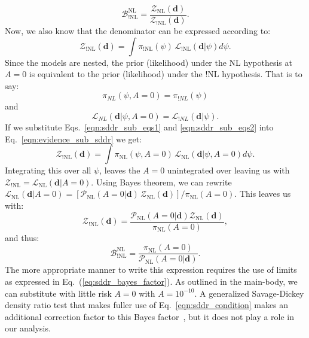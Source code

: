 \begin{equation}
    \mathcal{B}^{\mathrm{NL}}_{!\mathrm{NL}} = \frac{\mathcal{Z}_{\mathrm{NL}}(\mathbf{d})}{\mathcal{Z}_{\mathrm{!NL}}(\mathbf{d})}.
\end{equation}
Now, we also know that the denominator can be expressed according to:
\begin{equation}\label{eqn:evidence_sub_sddr}
    \mathcal{Z}_{\mathrm{!NL}}(\mathbf{d}) = \int \pi_{\mathrm{!NL}}\left(\psi\right) \, \mathcal{L}_{\mathrm{!NL}} \left(\mathbf{d} | \psi \right)  d\psi.
\end{equation}
Since the models are nested, the prior (likelihood) under the NL hypothesis at $A=0$ is equivalent to the prior (likelihood) under the !NL hypothesis. That is to say:
\begin{equation}\label{eqn:sddr_sub_eqs1}
\pi_{NL}\left(\psi, A=0\right) = \pi_{!NL}\left(\psi \right) \end{equation}
and
\begin{equation}
\label{eqn:sddr_sub_eqs2}
\mathcal{L}_{NL}\left(\mathbf{d}|\psi, A=0\right) = \mathcal{L}_{!NL}\left( \mathbf{d} | \psi \right).
\end{equation}
If we substitute Eqs.~\ref{eqn:sddr_sub_eqs1} and \ref{eqn:sddr_sub_eqs2} into Eq.~\ref{eqn:evidence_sub_sddr} we get:
\begin{equation}
    \mathcal{Z}_{\mathrm{!NL}}(\mathbf{d}) = \int \pi_{\mathrm{NL}}\left(\psi, A=0\right) \, \mathcal{L}_{\mathrm{NL}} \left(\mathbf{d} | \psi, A=0 \right)  d\psi.
\end{equation}
Integrating this over all $\psi$, leaves the $A=0$ unintegrated over leaving us with $\mathcal{Z}_{\mathrm{!NL}} = \mathcal{L}_{\mathrm{NL}} \left(\mathbf{d} | A=0 \right)$. Using Bayes theorem, we can rewrite $\mathcal{L}_{\mathrm{NL}} \left(\mathbf{d} | A=0 \right) = [\mathcal{P}_{\mathrm{NL}}(A=0 | \mathbf{d}) \, \mathcal{Z}_{\mathrm{NL}}(\mathbf{d})] / \pi_{\mathrm{NL}} (A=0)$. This leaves us with:
\begin{equation}
    \mathcal{Z}_{\mathrm{!NL}}\left(\mathbf{d}\right) = \frac{\mathcal{P}_{\mathrm{NL}}\left(A=0 | \mathbf{d}\right) \mathcal{Z}_{\mathrm{NL}} \left(\mathbf{d} \right)} {\pi_{\mathrm{NL}} \left(A=0\right)},
\end{equation}
and thus:
\begin{equation}
    \mathcal{B}^{\mathrm{NL}}_{\mathrm{!NL}} = \frac{\pi_{\mathrm{NL}}\left(A=0\right)}{\mathcal{P}_{\mathrm{NL}}\left(A=0 | \mathbf{d}\right)}.
\end{equation}
The more appropriate manner to write this expression requires the use of limits as expressed in Eq.~(\ref{eq:sddr_bayes_factor}). As outlined in the main-body, we can substitute with little risk $A=0$ with $A=10^{-10}$. A generalized Savage-Dickey density ratio test that makes fuller use of Eq.~\ref{eqn:sddr_condition} makes an additional correction factor to this Bayes factor~\citep{verdinelli1995computing}, but it does not play a role in our analysis.

